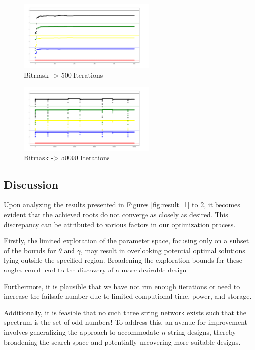 \documentclass[12pt]{article}
\begin{document}
\begin{figure}[htbp]
\centering
\includegraphics[width=0.6\textwidth]{Bitmask_500.png}
\caption{Bitmask -> 500 Iterations}
\label{fig:result_8}
\end{figure}

\begin{figure}[htbp]
\centering
\includegraphics[width=0.6\textwidth]{Bitmask_50000.png}
\caption{Bitmask -> 50000 Iterations}
\label{fig:result_9}
\end{figure}


\subsection{Discussion}

Upon analyzing the results presented in Figures \ref{fig:result_1} to \ref{fig:result_9}, it becomes evident that the achieved roots do not converge as closely as desired. This discrepancy can be attributed to various factors in our optimization process.

Firstly, the limited exploration of the parameter space, focusing only on a subset of the bounds for $\theta$ and $\gamma$, may result in overlooking potential optimal solutions lying outside the specified region. Broadening the exploration bounds for these angles could lead to the discovery of a more desirable design.

Furthermore, it is plausible that we have not run enough iterations or need to increase the failsafe number due to limited computional time, power, and storage.

Additionally, it is feasible that no such three string network exists such that the spectrum is the set of odd numbers! To address this, an avenue for improvement involves generalizing the approach to accommodate $n$-string designs, thereby broadening the search space and potentially uncovering more suitable designs.
\end{document}
